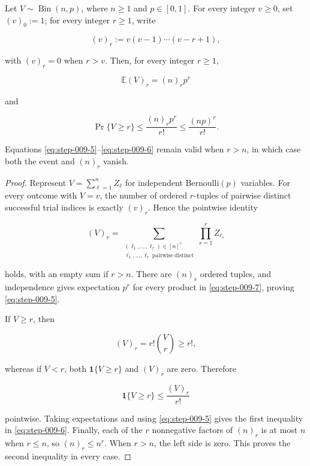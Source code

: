 \begin{lemma}\label{lem:step-009-factorial-tail}
Let \(V\sim\operatorname{Bin}(n,p)\), where \(n\ge1\) and
\(p\in[0,1]\). For every integer \(v\ge0\), set \((v)_0:=1\); for every
integer \(r\ge1\), write

\[
(v)_r:=v(v-1)\cdots(v-r+1),
\]

with \((v)_r=0\) when \(r>v\). Then, for every integer \(r\ge1\),

\[
\mathbb E(V)_r=(n)_r p^r
\tag{S9.5}\label{eq:step-009-5}
\]

and

\[
\Pr\{V\ge r\}
\le \frac{(n)_r p^r}{r!}
\le \frac{(np)^r}{r!}.
\tag{S9.6}\label{eq:step-009-6}
\]

Equations \eqref{eq:step-009-5}--\eqref{eq:step-009-6} remain valid when \(r>n\), in which case both the event
and \((n)_r\) vanish.
\end{lemma}

\begin{proof}
Represent \(V=\sum_{\ell=1}^n Z_\ell\) for independent
Bernoulli\((p)\) variables. For every outcome with \(V=v\), the number of
ordered \(r\)-tuples of pairwise distinct successful trial indices is
exactly \((v)_r\). Hence the pointwise identity

\[
(V)_r
=\sum_{\substack{(\ell_1,\ldots,\ell_r)\in[n]^r\\
                    \ell_1,\ldots,\ell_r\ \mathrm{pairwise\ distinct}}}
  \prod_{s=1}^r Z_{\ell_s}
\tag{S9.7}\label{eq:step-009-7}
\]

holds, with an empty sum if \(r>n\). There are \((n)_r\) ordered tuples,
and independence gives expectation \(p^r\) for every product in \eqref{eq:step-009-7},
proving \eqref{eq:step-009-5}.

If \(V\ge r\), then

\[
(V)_r=r!\binom Vr\ge r!,
\]

whereas if \(V<r\), both \(\mathbf1\{V\ge r\}\) and \((V)_r\) are zero.
Therefore

\[
\mathbf1\{V\ge r\}\le\frac{(V)_r}{r!}
\]

pointwise. Taking expectations and using \eqref{eq:step-009-5} gives the first inequality in
\eqref{eq:step-009-6}. Finally, each of the \(r\) nonnegative factors of \((n)_r\) is at
most \(n\) when \(r\le n\), so \((n)_r\le n^r\). When \(r>n\), the
left side is zero. This proves the second inequality in every case.
\end{proof}

